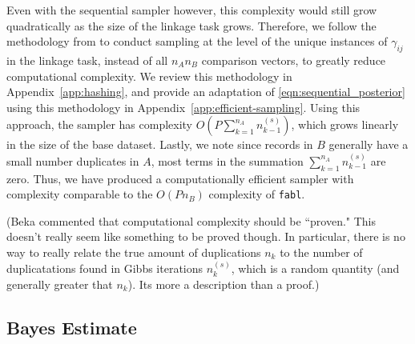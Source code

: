 \documentclass[12pt,letterpaper]{article}
\newcommand{\1}[1]{\mathbb{I}\!\left[#1\right]} %
\def \brian#1{{\color{red} (#1)}}
\begin{document}
Even with the sequential sampler however, this complexity would still grow quadratically as the size of the linkage task grows. Therefore, we follow the methodology from \cite{kundinger_2023} to conduct sampling at the level of the unique instances of $\gamma_{ij}$ in the linkage task, instead of all $n_A n_B$ comparison vectors, to greatly reduce computational complexity. We review this methodology in Appendix~\ref{app:hashing}, and provide an adaptation of \eqref{eqn:sequential_posterior} using this methodology in Appendix~\ref{app:efficient-sampling}. Using this approach, the sampler has complexity $O\left(P \sum_{k=1}^{n_A} n_{k-1}^{(s)}\right)$, which grows linearly in the size of the base dataset. Lastly, we note since records in $B$ generally have a small number duplicates in $A$, most terms in the summation  $\sum_{k=1}^{n_A} n_{k-1}^{(s)}$ are zero. Thus, we have produced a computationally efficient sampler with complexity comparable to the $O(P n_B)$ complexity of \texttt{fabl}. 

\brian{Beka commented that computational complexity should be ``proven." This doesn't really seem like something to be proved though. In particular, there is no way to really relate the true amount of duplications $n_k$ to the number of duplicatations found in Gibbs iterations $n_k^{(s)}$, which is a random quantity (and generally greater that $n_k$). Its more a description than a proof.}







\subsection{Bayes Estimate}\label{sec:bayes-estimate} 
\end{document}
